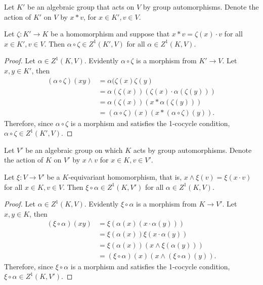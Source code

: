 \begin{lemma} \label{zeta}
	Let $K'$ be an algebraic group that acts on $V$ by group automorphisms. Denote the action of $K'$ on $V$ by $x \ast v$, for $x \in K', v \in V$.

	Let $\zeta:K'\rightarrow K$ be a homomorphism and suppose that $x \ast v = \zeta(x) \cdot v$ for all $x \in K', v \in V$. Then $\alpha \circ \zeta \in Z^1(K', V)$ for all $\alpha \in Z^1(K, V)$.
\end{lemma}
\begin{proof}
	Let $\alpha \in Z^1(K, V)$. Evidently $\alpha \circ \zeta$ is a morphism from $K' \rightarrow V$. Let $x, y \in K'$, then
	\begin{align*}
		(\alpha \circ \zeta)(xy) &= \alpha(\zeta(x)\zeta(y) \\
			&= \alpha(\zeta(x))\left(\zeta(x) \cdot \alpha(\zeta(y))\right) \\
			&= \alpha(\zeta(x))\left(x \ast \alpha(\zeta(y))\right) \\
			&= (\alpha \circ \zeta)(x)\left(x \ast (\alpha \circ \zeta)(y)\right).
	\end{align*}
	Therefore, since $\alpha \circ \zeta$ is a morphism and satisfies the 1-cocycle condition, $\alpha \circ \zeta \in Z^1(K', V)$.
\end{proof}

\begin{lemma} \label{xi}
	Let $V'$ be an algebraic group on which $K$ acts by group automorphisms. Denote the action of $K$ on $V'$ by $x \wedge v$ for $x \in K, v \in V'$.

	Let $\xi: V \rightarrow V'$ be a $K$-equivariant homomorphism, that is, $x \wedge \xi(v) = \xi(x \cdot v)$ for all $x \in K, v \in V$. Then $\xi \circ \alpha \in Z^1(K, V')$ for all $\alpha \in Z^1(K, V)$. 
\end{lemma}
\begin{proof}
	Let $\alpha \in Z^1(K, V)$. Evidently $\xi \circ \alpha$ is a morphism from $K \rightarrow V'$. Let $x, y \in K$, then
	\begin{align*}
		(\xi \circ \alpha)(xy) &= \xi\left(\alpha(x)(x \cdot \alpha(y))\right) \\
			&= \xi(\alpha(x))\xi(x \cdot \alpha(y)) \\
			&= \xi(\alpha(x))\left(x \wedge \xi(\alpha(y))\right) \\
			&= (\xi \circ \alpha)(x)\left(x \wedge (\xi \circ \alpha)(y)\right).
	\end{align*}
	Therefore, since $\xi \circ \alpha$ is a morphism and satisfies the 1-cocycle condition, $\xi \circ \alpha \in Z^1(K, V')$.
\end{proof}

